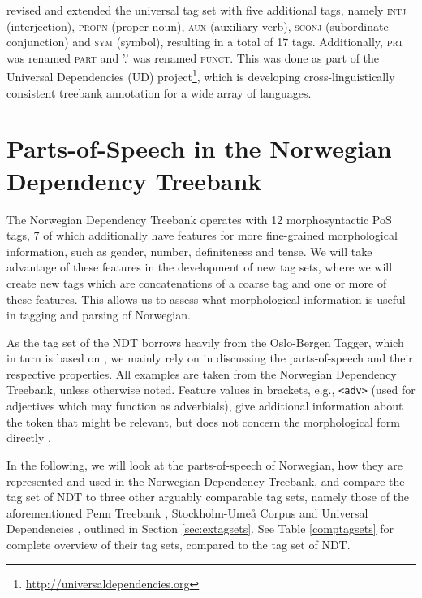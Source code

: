 \documentclass[a4paper,12pt,english]{book}
\begin{document}
 revised and extended the universal tag set with five additional
tags, namely \textsc{intj} (interjection), \textsc{propn} (proper noun),
\textsc{aux} (auxiliary verb), \textsc{sconj} (subordinate conjunction) and
\textsc{sym} (symbol), resulting in a total of 17 tags. Additionally,
\textsc{prt} was renamed \textsc{part} and '.' was renamed \textsc{punct}. This
was done as part of the Universal Dependencies (UD)
project\footnote{\url{http://universaldependencies.org}}, which is developing
cross-linguistically consistent treebank annotation for a wide array of
languages.

\section{Parts-of-Speech in the Norwegian Dependency Treebank}
\label{sec:posndt}
The Norwegian Dependency Treebank operates with 12 morphosyntactic PoS tags,
7 of which additionally have features for more fine-grained morphological
information, such as  gender, number, definiteness and tense.
We will take advantage of these features in the development of new tag sets,
where we will create new tags which are concatenations of a coarse tag and one
or more of these features.
This allows us to assess what morphological information is useful in
tagging and parsing of Norwegian.

As the tag set of the NDT borrows heavily from the Oslo-Bergen Tagger, which in
turn is based on , we mainly rely on
 in discussing the parts-of-speech and their respective
properties. All examples are taken from the Norwegian Dependency Treebank,
unless otherwise noted.  Feature values in brackets, e.g., \texttt{<adv>} (used
for adjectives which may function as adverbials), give additional information
about the token that might be relevant, but does not concern the morphological
form directly \cite{Kin:Sol:Eri:13}.

In the following, we will look at the parts-of-speech of Norwegian, how they
are represented and used in the Norwegian Dependency Treebank, and compare the
tag set of NDT to three other arguably comparable tag sets, namely those of the
aforementioned Penn Treebank \cite{Mar:San:Mar:93}, Stockholm-Umeå Corpus
\cite{Gus:Har:06} and Universal Dependencies \cite{Niv:15}, outlined in Section
\ref{sec:extagsets}. See Table \ref{comptagsets} for complete overview of their
tag sets, compared to the tag set of NDT.
\end{document}
